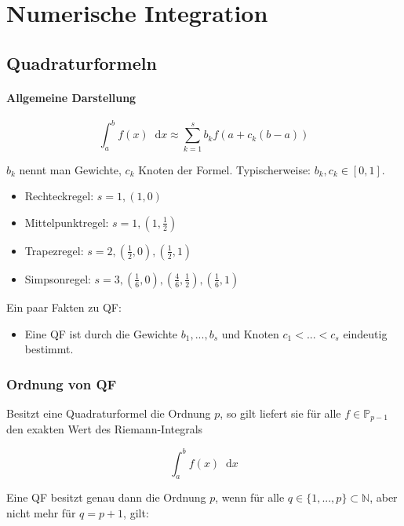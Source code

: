 \documentclass[a4paper, 14pt]{article}
\newcommand*\diff{\mathop{}\!\mathrm{d}}
\begin{document}
	\section{Numerische Integration}

	\subsection{Quadraturformeln}

	\paragraph{Allgemeine Darstellung}

	\begin{equation}
		\int_a^b{f(x) \diff x} \approx \sum_{k = 1}^{s}{b_k f(a + c_k (b - a))}
	\end{equation}

	$b_k$ nennt man Gewichte, $c_k$ Knoten der Formel.
	Typischerweise: $b_k, c_k \in [0, 1]$.

	\begin{itemize}
		\item Rechteckregel: $s = 1, (1, 0)$
		\item Mittelpunktregel: $s = 1, (1, \frac{1}{2})$
		\item Trapezregel: $s = 2, (\frac{1}{2}, 0), (\frac{1}{2}, 1)$
		\item Simpsonregel: $s = 3, (\frac{1}{6}, 0), (\frac{4}{6}, \frac{1}{2}), (\frac{1}{6}, 1)$
	\end{itemize}

	Ein paar Fakten zu QF:

	\begin{itemize}
		\item Eine QF ist durch die Gewichte $b_1, ..., b_s$ und Knoten $c_1 < ...  < c_s$ eindeutig bestimmt.
	\end{itemize}

	\subsubsection{Ordnung von QF}

	Besitzt eine Quadraturformel die Ordnung $p$, so gilt liefert sie für alle $f \in \mathbb{P}_{p-1}$ den exakten Wert des Riemann-Integrals

	\begin{equation}
		\int_a^b{f(x) \diff x}
	\end{equation}

	Eine QF besitzt genau dann die Ordnung $p$, wenn für alle $q \in \{1, ..., p\} \subset \mathbb{N}$, aber nicht mehr für $q = p + 1$, gilt:
\end{document}
